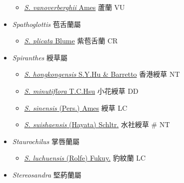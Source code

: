 \begin{itemize}
  \begin{itemize}
        \item[] \href{http://www.theplantlist.org/tpl1.1/search?q=Schoenorchis+vanoverberghii}{\textit{S. vanoverberghii} Ames}   蘆蘭   VU
  \end{itemize}
 \item[] \textit{Spathoglottis} 苞舌蘭屬
                                
  \begin{itemize}
        \item[] \href{http://www.theplantlist.org/tpl1.1/search?q=Spathoglottis+plicata}{\textit{S. plicata} Blume}   紫苞舌蘭   CR
  \end{itemize}
 \item[] \textit{Spiranthes} 綬草屬
                                
  \begin{itemize}
        \item[] \href{http://www.theplantlist.org/tpl1.1/search?q=Spiranthes+hongkongensis}{\textit{S. hongkongensis} S.Y.Hu \& Barretto}   香港綬草   NT
        \item[] \href{http://www.theplantlist.org/tpl1.1/search?q=Spiranthes+minutiflora}{\textit{S. minutiflora} T.C.Hsu}   小花綬草   DD
        \item[] \href{http://www.theplantlist.org/tpl1.1/search?q=Spiranthes+sinensis}{\textit{S. sinensis} (Pers.) Ames}   綬草   LC
        \item[] \href{http://www.theplantlist.org/tpl1.1/search?q=Spiranthes+suishaensis}{\textit{S. suishaensis} (Hayata) Schltr.}   水社綬草  \# NT
  \end{itemize}
 \item[] \textit{Staurochilus} 掌唇蘭屬
                                
  \begin{itemize}
        \item[] \href{http://www.theplantlist.org/tpl1.1/search?q=Staurochilus+luchuensis}{\textit{S. luchuensis} (Rolfe) Fukuy.}   豹紋蘭   LC
  \end{itemize}
 \item[] \textit{Stereosandra} 堅葯蘭屬
                                

\end{itemize}
